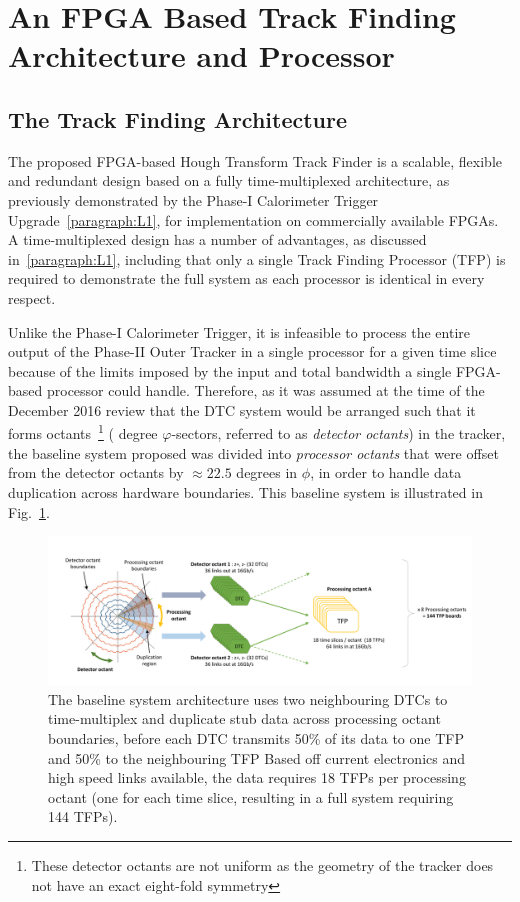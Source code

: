 \section{An FPGA Based Track Finding Architecture and Processor}\label{sec:TMTT}
\subsection{The Track Finding Architecture}\label{subsec:TFA}
The proposed FPGA-based Hough Transform Track Finder is a scalable, flexible and redundant design based on a fully time-multiplexed architecture, as previously demonstrated by the Phase-I Calorimeter Trigger Upgrade~\ref{paragraph:L1}, for implementation on commercially available FPGAs.
A time-multiplexed design has a number of advantages, as discussed in~\ref{paragraph:L1}, including that only a single Track Finding Processor (TFP) is required to demonstrate the full system as each processor is identical in every respect.

Unlike the Phase-I Calorimeter Trigger, it is infeasible to process the entire output of the Phase-II Outer Tracker in a single processor for a given time slice because of the limits imposed by the input and total bandwidth a single FPGA-based processor could handle.
Therefore, as it was assumed at the time of the December 2016 review that the DTC system would be arranged such that it forms octants~\footnote{These detector octants are not uniform as the geometry of the tracker does not have an exact eight-fold symmetry} ( degree $\varphi$-sectors, referred to as \emph {detector octants}) in the tracker, the baseline system proposed was divided into \emph{processor octants} that were offset from the detector octants by $\approx 22.5$ degrees in $\phi$, in order to handle data duplication across hardware boundaries.
This baseline system is illustrated in Fig.~\ref{fig:tmttarch}.

\begin{figure}[t]
\centering
\includegraphics[width=1.00\textwidth]{figs/tk-upgrade/tmttarch.pdf}
\caption{The baseline system architecture uses two neighbouring DTCs to time-multiplex and duplicate stub data across processing octant boundaries, before each DTC transmits 50\% of its data to one TFP and 50\% to the neighbouring TFP Based off current electronics and high speed links available, the data requires 18 TFPs per processing octant (one for each time slice, resulting in a full system requiring 144 TFPs).}
\label{fig:tmttarch}
\end{figure}

